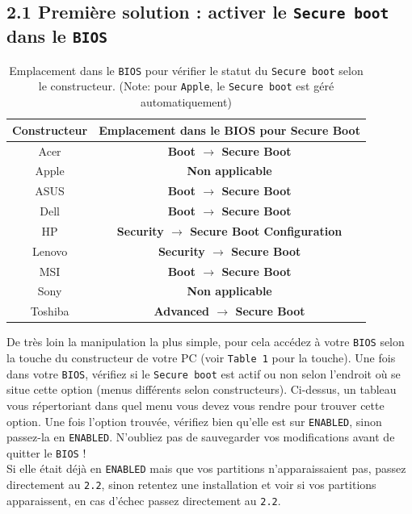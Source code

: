 \documentclass[french, a4paper, 11pt]{article}
\begin{document}
\subsection*{2.1 Première solution : activer le \texttt{Secure boot} dans le \texttt{BIOS}}
\begin{table}[ht]
    \centering
    \begin{tabular}{|c|>{\bfseries}c|}
        \hline
        \textbf{Constructeur} & \textbf{Emplacement dans le BIOS pour Secure Boot} \\
        \hline
        Acer & Boot $\rightarrow$ Secure Boot \\
        Apple & Non applicable \\
        ASUS & Boot $\rightarrow$ Secure Boot \\
        Dell & Boot $\rightarrow$ Secure Boot \\
        HP & Security $\rightarrow$ Secure Boot Configuration \\
        Lenovo & Security $\rightarrow$ Secure Boot \\
        MSI & Boot $\rightarrow$ Secure Boot \\
        Sony & Non applicable \\
        Toshiba & Advanced $\rightarrow$ Secure Boot \\
        \hline
    \end{tabular}
    \caption{Emplacement dans le \texttt{BIOS} pour vérifier le statut du \texttt{Secure boot} selon le constructeur. (Note: pour \texttt{Apple}, le \texttt{Secure boot} est géré automatiquement)}
    \label{tab:secure-boot-location}
\end{table}
\noindent De très loin la manipulation la plus simple, pour cela accédez à votre \texttt{BIOS} selon la touche du constructeur de votre PC (voir \texttt{Table 1} pour la touche). Une fois dans votre \texttt{BIOS}, vérifiez si le \texttt{Secure boot} est actif ou non selon l'endroit où se situe cette option (menus différents selon constructeurs). Ci-dessus, un tableau vous répertoriant dans quel menu vous devez vous rendre pour trouver cette option. Une fois l'option trouvée, vérifiez bien qu'elle est sur \texttt{ENABLED}, sinon passez-la en \texttt{ENABLED}. N'oubliez pas de sauvegarder vos modifications avant de quitter le \texttt{BIOS} !\\
\noindent Si elle était déjà en \texttt{ENABLED} mais que vos partitions n'apparaissaient pas, passez directement au \texttt{2.2}, sinon retentez une installation et voir si vos partitions apparaissent, en cas d'échec passez directement au \texttt{2.2}.
\end{document}
